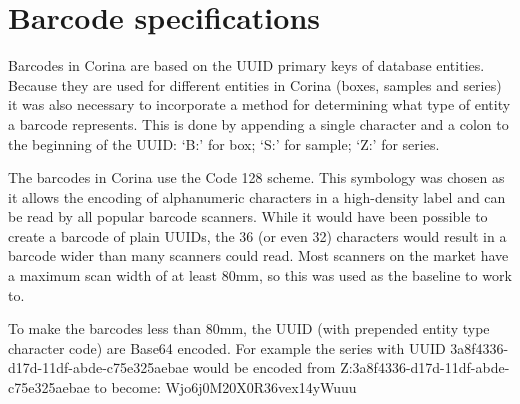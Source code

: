 \section{Barcode specifications}
\label{txt:barcodeSpecs}
Barcodes in Corina are based on the UUID primary keys of database entities.  Because they are used for different entities in Corina (boxes, samples and series) it was also necessary to incorporate a method for determining what type of entity a barcode represents. This is done by appending a single character and a colon to the beginning of the UUID: `B:' for box; `S:' for sample; `Z:' for series.

The barcodes in Corina use the Code 128 scheme. This symbology was chosen as it allows the encoding of alphanumeric characters in a high-density label and can be read by all popular barcode scanners. While it would have been possible to create a barcode of plain UUIDs, the 36 (or even 32) characters would result in a barcode wider than many scanners could read. Most scanners on the market have a maximum scan width of at least 80mm, so this was used as the baseline to work to.

To make the barcodes less than 80mm, the UUID (with prepended entity type character code) are Base64 encoded. For example the series with UUID 3a8f4336-d17d-11df-abde-c75e325aebae would be encoded from Z:3a8f4336-d17d-11df-abde-c75e325aebae to become: Wjo6j0M20X0R36vex14yWuuu 

